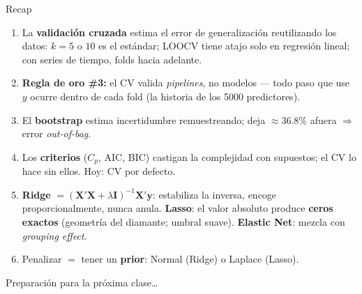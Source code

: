 \documentclass{beamer}
\newcommand{\1}{\mathbb{I}}
\begin{document}
\begin{frame}{Recap}
\small
\begin{enumerate}\itemsep6pt
  \item La \textbf{validación cruzada} estima el error de generalización reutilizando los datos: $k = 5$ o $10$ es el estándar; LOOCV tiene atajo solo en regresión lineal; con series de tiempo, folds hacia adelante.
  \item \textbf{Regla de oro \#3:} el CV valida \emph{pipelines}, no modelos --- todo paso que use $y$ ocurre dentro de cada fold (la historia de los 5000 predictores).
  \item El \textbf{bootstrap} estima incertidumbre remuestreando; deja $\approx 36.8\%$ afuera $\Rightarrow$ error \emph{out-of-bag}.
  \item Los \textbf{criterios} ($C_p$, AIC, BIC) castigan la complejidad con supuestos; el CV lo hace sin ellos. Hoy: CV por defecto.
  \item \textbf{Ridge} $= (\mathbf{X}'\mathbf{X} + \lambda\mathbf{I})^{-1}\mathbf{X}'\mathbf{y}$: estabiliza la inversa, encoge proporcionalmente, nunca anula. \textbf{Lasso}: el valor absoluto produce \textbf{ceros exactos} (geometría del diamante; umbral suave). \textbf{Elastic Net}: mezcla con \emph{grouping effect}.
  \item Penalizar $=$ tener un \textbf{prior}: Normal (Ridge) o Laplace (Lasso).
\end{enumerate}
\end{frame}

\begin{frame}
\vspace{2.0cm}
\Large{Preparación para la próxima clase\ldots}
\end{frame}

\end{document}
